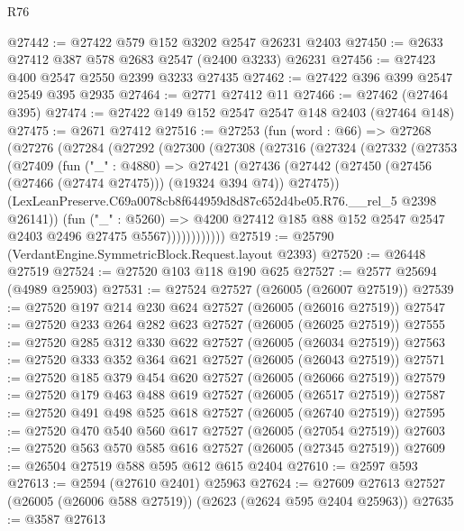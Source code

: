 \begin{lexlean}{R76}
\begin{coremodule}
@27442 := @27422 @579 @152 @3202 @2547 @26231 @2403
@27450 := @2633 @27412 @387 @578 @2683 @2547 (@2400 @3233) @26231
@27456 := @27423 @400 @2547 @2550 @2399 @3233 @27435
@27462 := @27422 @396 @399 @2547 @2549 @395 @2935
@27464 := @2771 @27412 @11
@27466 := @27462 (@27464 @395)
@27474 := @27422 @149 @152 @2547 @2547 @148 @2403 (@27464 @148)
@27475 := @2671 @27412
@27516 := @27253
    (fun (word : @66) =>
    @27268
      (@27276
        (@27284
          (@27292
            (@27300
              (@27308
                (@27316
                  (@27324
                    (@27332
                      (@27353
                        (@27409
                          (fun ("_" : @4880) =>
                          @27421
                            (@27436
                              (@27442
                                (@27450 (@27456 (@27466 (@27474 @27475))) (@19324 @394 @74))
                                @27475))
                            (LexLeanPreserve.C69a0078cb8f644959d8d87c652d4be05.R76.__rel_5
                              @2398
                              @26141))
                          (fun ("_" : @5260) =>
                          @4200
                            @27412
                            @185
                            @88
                            @152
                            @2547
                            @2547
                            @2403
                            @2496
                            @27475
                            @5567))))))))))))
@27519 := @25790 (VerdantEngine.SymmetricBlock.Request.layout @2393)
@27520 := @26448 @27519
@27524 := @27520 @103 @118 @190 @625
@27527 := @2577 @25694 (@4989 @25903)
@27531 := @27524 @27527 (@26005 (@26007 @27519))
@27539 := @27520 @197 @214 @230 @624 @27527 (@26005 (@26016 @27519))
@27547 := @27520 @233 @264 @282 @623 @27527 (@26005 (@26025 @27519))
@27555 := @27520 @285 @312 @330 @622 @27527 (@26005 (@26034 @27519))
@27563 := @27520 @333 @352 @364 @621 @27527 (@26005 (@26043 @27519))
@27571 := @27520 @185 @379 @454 @620 @27527 (@26005 (@26066 @27519))
@27579 := @27520 @179 @463 @488 @619 @27527 (@26005 (@26517 @27519))
@27587 := @27520 @491 @498 @525 @618 @27527 (@26005 (@26740 @27519))
@27595 := @27520 @470 @540 @560 @617 @27527 (@26005 (@27054 @27519))
@27603 := @27520 @563 @570 @585 @616 @27527 (@26005 (@27345 @27519))
@27609 := @26504 @27519 @588 @595 @612 @615 @2404
@27610 := @2597 @593
@27613 := @2594 (@27610 @2401) @25963
@27624 := @27609 @27613 @27527 (@26005 (@26006 @588 @27519)) (@2623 (@2624 @595 @2404 @25963))
@27635 := @3587
    @27613

\end{coremodule}
\end{lexlean}
